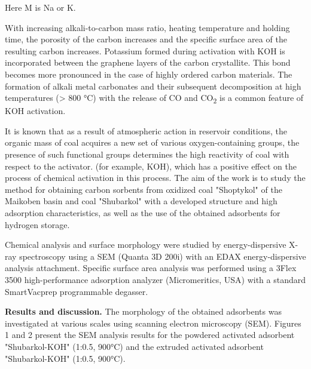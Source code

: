 \begin{multicols}{2}
Here M is Na or K.

With increasing alkali-to-carbon mass ratio, heating temperature and
holding time, the porosity of the carbon increases and the specific
surface area of \hspace{0pt}\hspace{0pt}the resulting carbon increases.
Potassium formed during activation with KOH is incorporated between the
graphene layers of the carbon crystallite. This bond becomes more
pronounced in the case of highly ordered carbon materials. The formation
of alkali metal carbonates and their subsequent decomposition at high
temperatures (\textgreater{} 800 °C) with the release of CO and
CO\textsubscript{2} is a common feature of KOH activation.

It is known that as a result of atmospheric action in reservoir
conditions, the organic mass of coal acquires a new set of various
oxygen-containing groups, the presence of such functional groups
determines the high reactivity of coal with respect to the activator.
(for example, KOH), which has a positive effect on the process of
chemical activation in this process. The aim of the work is to study the
method for obtaining carbon sorbents from oxidized coal "Shoptykol" of
the Maikoben basin and coal "Shubarkol" with a developed structure and
high adsorption characteristics, as well as the use of the obtained
adsorbents for hydrogen storage.

Chemical analysis and surface morphology were studied by
energy-dispersive X-ray spectroscopy using a SEM (Quanta 3D 200i) with
an EDAX energy-dispersive analysis attachment. Specific surface area
analysis was performed using a 3Flex 3500 high-performance adsorption
analyzer (Micromeritics, USA) with a standard SmartVacprep programmable
degasser.

{\bfseries Results and discussion.} The morphology of the obtained
adsorbents was investigated at various scales using scanning electron
microscopy (SEM). Figures 1 and 2 present the SEM analysis results for
the powdered activated adsorbent "Shubarkol-KOH" (1:0.5, 900°C) and the
extruded activated adsorbent "Shubarkol-KOH" (1:0.5, 900°C).
\end{multicols}

